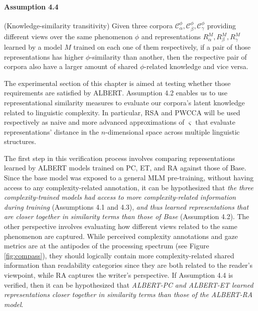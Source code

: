 \documentclass[a4paper, nobind]{templates/ociamthesis}
\begin{document}
\paragraph{Assumption 4.4} (Knowledge-similarity transitivity) Given three corpora \(\mathcal{C}^\phi_\alpha, \mathcal{C}^\phi_\beta, \mathcal{C}^\phi_\gamma\) providing different views over the same phenomenon \(\phi\) and representations \(R^{M}_{\alpha}, R^{M}_{\beta}, R^{M}_{\gamma}\) learned by a model \(M\) trained on each one of them respectively, if a pair of those representations has higher \(\phi\)-similarity than another, then the respective pair of corpora also have a larger amount of shared \(\phi\)-related knowledge and vice versa.

The experimental section of this chapter is aimed at testing whether those requirements are satisfied by ALBERT. Assumption 4.2 enables us to use representational similarity measures to evaluate our corpora's latent knowledge related to linguistic complexity. In particular, RSA and PWCCA will be used respectively as naive and more advanced approximations of \(\varsigma\) that evaluate representations' distance in the \(n\)-dimensional space across multiple linguistic structures.

The first step in this verification process involves comparing representations learned by ALBERT models trained on PC, ET, and RA against those of Base. Since the base model was exposed to a general MLM pre-training, without having access to any complexity-related annotation, it can be hypothesized that \emph{the three complexity-trained models had access to more complexity-related information during training} (Assumptions 4.1 and 4.3), \emph{and thus learned representations that are closer together in similarity terms than those of Base} (Assumption 4.2). The other perspective involves evaluating how different views related to the same phenomenon are captured. While perceived complexity annotations and gaze metrics are at the antipodes of the processing spectrum (see Figure \ref{fig:compass}), they should logically contain more complexity-related shared information than readability categories since they are both related to the reader's viewpoint, while RA captures the writer's perspective. If Assumption 4.4 is verified, then it can be hypothesized that \emph{ALBERT-PC and ALBERT-ET learned representations closer together in similarity terms than those of the ALBERT-RA model}.
\end{document}
